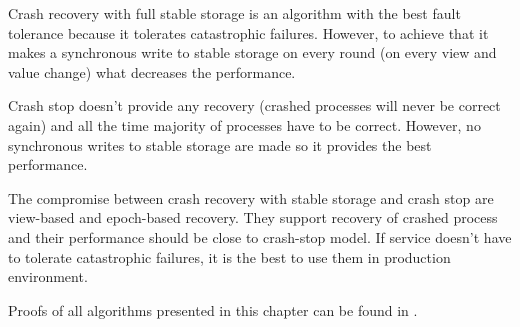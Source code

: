 Crash recovery with full stable storage is an algorithm with the best fault tolerance because it tolerates catastrophic failures. However, to achieve that it makes a synchronous write to stable storage on every round (on every view and value change) what decreases the performance.

Crash stop doesn't provide any recovery (crashed processes will never be correct again) and all the time majority of processes have to be correct. However, no synchronous writes to stable storage are made so it provides the best performance.

The compromise between crash recovery with stable storage and crash stop are view-based and epoch-based recovery. They support recovery of crashed process and their performance should be close to crash-stop model. If service doesn't have to tolerate catastrophic failures, it is the best to use them in production environment.

Proofs of all algorithms presented in this chapter can be found in \cite{Nun10}. 
